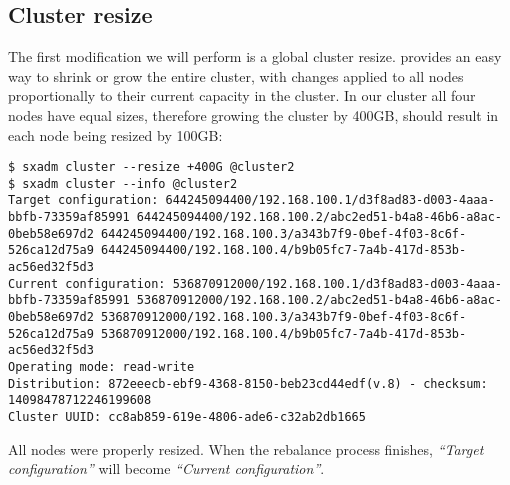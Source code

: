 \subsection{Cluster resize}
The first modification we will perform is a global cluster resize.
 provides an easy way to shrink or grow
the entire cluster, with changes applied to all nodes proportionally to
their current capacity in the cluster. In our cluster all four nodes
have equal sizes, therefore growing the cluster by 400GB, should result
in each node being resized by 100GB:
\begin{lstlisting}
$ sxadm cluster --resize +400G @cluster2
$ sxadm cluster --info @cluster2
Target configuration: 644245094400/192.168.100.1/d3f8ad83-d003-4aaa-bbfb-73359af85991 644245094400/192.168.100.2/abc2ed51-b4a8-46b6-a8ac-0beb58e697d2 644245094400/192.168.100.3/a343b7f9-0bef-4f03-8c6f-526ca12d75a9 644245094400/192.168.100.4/b9b05fc7-7a4b-417d-853b-ac56ed32f5d3 
Current configuration: 536870912000/192.168.100.1/d3f8ad83-d003-4aaa-bbfb-73359af85991 536870912000/192.168.100.2/abc2ed51-b4a8-46b6-a8ac-0beb58e697d2 536870912000/192.168.100.3/a343b7f9-0bef-4f03-8c6f-526ca12d75a9 536870912000/192.168.100.4/b9b05fc7-7a4b-417d-853b-ac56ed32f5d3 
Operating mode: read-write
Distribution: 872eeecb-ebf9-4368-8150-beb23cd44edf(v.8) - checksum: 14098478712246199608
Cluster UUID: cc8ab859-619e-4806-ade6-c32ab2db1665
\end{lstlisting}
All nodes were properly resized. When the rebalance process finishes, \emph{``Target
configuration''} will become \emph{``Current configuration''}.

